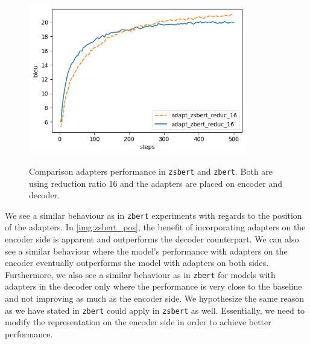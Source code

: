 \begin{figure}[t]
    {\includegraphics[width=0.85\textwidth]{img/zbert_vs_zsbert.png}}
    \centering
    \caption{Comparison adapters performance in \texttt{zsbert} and \texttt{zbert}. Both are using reduction ratio 16 and the adapters are placed on encoder and decoder.}
    \label{img:zbert_vs_zsbert}
\end{figure}

We see a similar behaviour as in \texttt{zbert} experiments with regards to the position of the adapters. In \cref{img:zsbert_pos}, the benefit of incorporating adapters on the encoder side is apparent and outperforms the decoder counterpart. We can also see a similar behaviour where the model's performance with adapters on the encoder eventually outperforms the model with adapters on both sides. Furthermore, we also see a similar behaviour as in \texttt{zbert} for models with adapters in the decoder only where the performance is very close to the baseline and not improving as much as the encoder side. We hypothesize the same reason as we have stated in \texttt{zbert} could apply in \texttt{zsbert} as well. Essentially, we need to modify the representation on the encoder side in order to achieve better performance.
